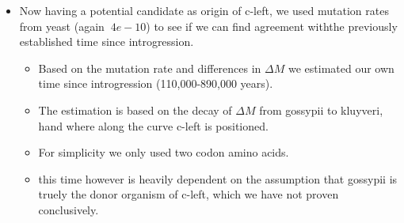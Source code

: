 \documentclass[12pt]{article}
\begin{document}
\begin{itemize}
\begin{itemize}
	\end{itemize}
	\item Now having a potential candidate as origin of c-left, we used mutation rates from yeast (again $~4e-10$) to see if we can find agreement withthe  previously established time since introgression.
	\begin{itemize}
		\item Based on the mutation rate and differences in $\Delta M$ we estimated our own time since introgression (110,000-890,000 years).
		\item The estimation is based on the decay of $\Delta M$ from gossypii to kluyveri, hand where along the curve c-left is positioned. 
		\item For simplicity we only used two codon amino acids.
		\item this time however is heavily dependent on the assumption that gossypii is truely the donor organism of c-left, which we have not proven conclusively.
	\end{itemize}
\end{itemize}
\end{document}
